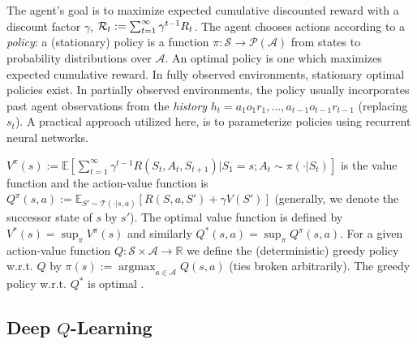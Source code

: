 \documentclass{article}
\def\argmax{\mathop{\arg\max}}
\def\R{{\cal R}}
\def\R{{\cal R}}
\begin{document}

The agent's goal is to maximize expected cumulative discounted reward with a discount factor $\gamma$, $\R_t := \sum_{t=1}^{\infty}{\gamma^{t-1} R_{t}}$. The agent chooses actions according to a \emph{policy}: a (stationary)  policy is a function $\pi:\mathcal{S}\to\mathcal{P(A)}$ from states to probability distributions over $\mathcal{A}$. An optimal policy is one which maximizes expected cumulative reward. In fully observed environments, stationary optimal policies exist. In partially observed environments, the policy usually incorporates past agent observations from the \emph{history} $h_t=a_1o_1r_1,...,a_{t-1}o_{t-1}r_{t-1}$ (replacing $s_t$). A practical approach utilized here, is to parameterize policies using recurrent neural networks.

$V^\pi(s) := \mathbb{E} [\sum_{t=1}^\infty \gamma^{t-1} R(S_t, A_t,S_{t+1})|S_1 = s;A_t\sim \pi(\cdot|S_t)]$ is the value function and the action-value function is $Q^\pi(s,a) :=  \mathbb{E}_{S'\sim \mathcal{T}(\cdot|s,a)} [R(S, a,S') + \gamma V(S')]$ (generally, we denote the successor state of $s$ by $s'$). The optimal value function is defined by $V^*(s) = \sup _\pi  V^\pi(s)$ and similarly  $Q^*(s,a) = \sup_\pi Q^\pi(s,a)$. For a given action-value function $Q : \mathcal{S} \times \mathcal{A}\to \mathbb{R}$ we define the (deterministic) greedy policy w.r.t. $Q$ by $\pi(s) := \argmax_ {a\in\mathcal{A}} Q(s, a)$ (ties broken arbitrarily). The greedy policy w.r.t. $Q^*$ is optimal \citep[e.g.][]{SzepesvariAlgorithms}.

\subsection{Deep $Q$-Learning}
\end{document}
